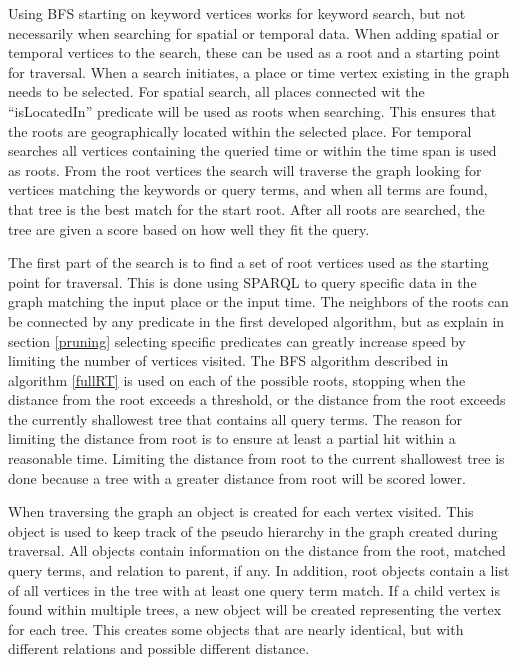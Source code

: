 Using BFS starting on keyword vertices works for keyword search, but not necessarily when searching for spatial or temporal data. When adding spatial or temporal vertices to the search, these can be used as a root and a starting point for traversal. When a search initiates, a place or time vertex existing in the graph needs to be selected. For spatial search, all places connected wit the ``isLocatedIn'' predicate will be used as roots when searching. This ensures that the roots are geographically located within the selected place. For temporal searches all vertices containing the queried time or within the time span is used as roots. From the root vertices the search will traverse the graph looking for vertices matching the keywords or query terms, and when all terms are found, that tree is the best match for the start root. After all roots are searched, the tree are given a score based on how well they fit the query.

The first part of the search is to find a set of root vertices used as the starting point for traversal. This is done using SPARQL to query specific data in the graph matching the input place or the input time. The neighbors of the roots can be connected by any predicate in the first developed algorithm, but as explain in section \ref{pruning} selecting specific predicates can greatly increase speed by limiting the number of vertices visited. The BFS algorithm described in algorithm \ref{fullRT} is used on each of the possible roots, stopping when the distance from the root exceeds a threshold, or the distance from the root exceeds the currently shallowest tree that contains all query terms. The reason for limiting the distance from root is to ensure at least a partial hit within a reasonable time. Limiting the distance from root to the current shallowest tree is done because a tree with a greater distance from root will be scored lower.

When traversing the graph an object is created for each vertex visited. This object is used to keep track of the pseudo hierarchy in the graph created during traversal. All objects contain information on the distance from the root, matched query terms, and relation to parent, if any. In addition, root objects contain a list of all vertices in the tree with at least one query term match. If a child vertex is found within multiple trees, a new object will be created representing the vertex for each tree. This creates some objects that are nearly identical, but with different relations and possible different distance.

